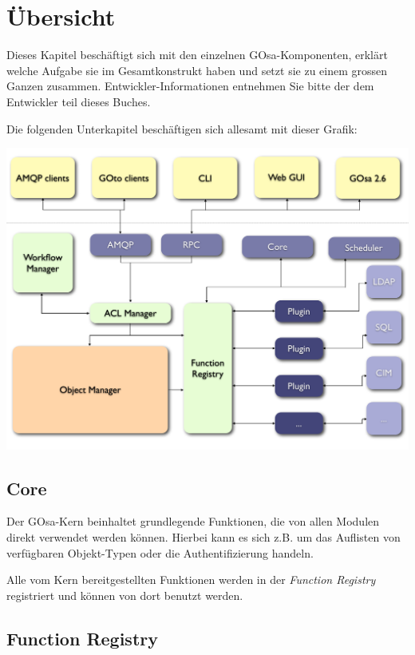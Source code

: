 \chapter{Übersicht}

Dieses Kapitel beschäftigt sich mit den einzelnen GOsa-Komponenten, erklärt
welche Aufgabe sie im Gesamtkonstrukt haben und setzt sie zu einem grossen
Ganzen zusammen. Entwickler-Informationen entnehmen Sie bitte der dem Entwickler
teil dieses Buches.

Die folgenden Unterkapitel beschäftigen sich allesamt mit dieser Grafik:

\begin{minipage}{\linewidth}
 \centering
 \includegraphics[width=1\textwidth]{media/gosa-design-overview.pdf}
 \label{fig:DesignOverview}
\end{minipage}


\section{Core}

Der GOsa-Kern beinhaltet grundlegende Funktionen, die von allen Modulen
direkt verwendet werden können. Hierbei kann es sich z.B. um das Auflisten
von verfügbaren Objekt-Typen oder die Authentifizierung handeln.

Alle vom Kern bereitgestellten Funktionen werden in der \textit{Function Registry}
registriert und können von dort benutzt werden.


\section{Function Registry}


